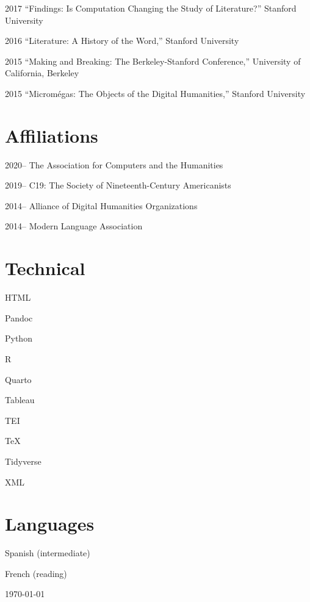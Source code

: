 \documentclass[12pt,letterpaper]{report}
\newcommand{\listitemspace}{0.25em}
\renewenvironment{itemize}
{\begin{list}{}{\setlength{\leftmargin}{0em}
                \setlength{\parskip}{0em}
                \setlength{\itemsep}{\listitemspace}
                \setlength{\parsep}{\listitemspace}}}
{\end{list}}
\begin{document}
\begin{tablist}
	\item[2017] \tab{}\enquote{Findings: Is Computation Changing the Study of Literature?} Stanford University
	\item[2016] \tab{}\enquote{Literature: A History of the Word,} Stanford University
	\item[2015] \tab{}\enquote{Making and Breaking: The Berkeley-Stanford Conference,} University of California, Berkeley
	\item[2015] \tab{}\enquote{Micromégas: The Objects of the Digital Humanities,} Stanford University
\end{tablist}


\section*{Affiliations}

\begin{tablist}
	\item[2020--] \tab{}The Association for Computers and the Humanities
	\item[2019--] \tab{}C19: The Society of Nineteenth-Century Americanists
	\item[2014--] \tab{}Alliance of Digital Humanities Organizations
	\item[2014--] \tab{}Modern Language Association
\end{tablist}

\section*{Technical}

\begin{itemize}
	\item HTML
	\item Pandoc
	\item Python
	\item R
	\item Quarto
	\item Tableau
	\item TEI
	\item TeX
	\item Tidyverse
	\item XML
\end{itemize}

\section*{Languages}

\begin{itemize}
	\item Spanish (intermediate)
	\item French (reading)
\end{itemize}

\vfill
\begin{center}
	\today
\end{center}
\end{document}

